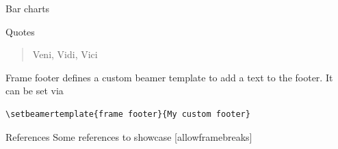 \begin{frame}{Bar charts}
    \begin{figure}
    \end{figure}
\end{frame}
\begin{frame}{Quotes}
    \begin{quote}
        Veni, Vidi, Vici
    \end{quote}
\end{frame}

{%
\begin{frame}[fragile]{Frame footer}
        \themename defines a custom beamer template to add a text to the footer. It can be set via
        \begin{verbatim}\setbeamertemplate{frame footer}{My custom footer}\end{verbatim}
\end{frame}
}

\begin{frame}{References}
    Some references to showcase [allowframebreaks] \cite{knuth92,ConcreteMath,Simpson,Er01,greenwade93}
\end{frame}


